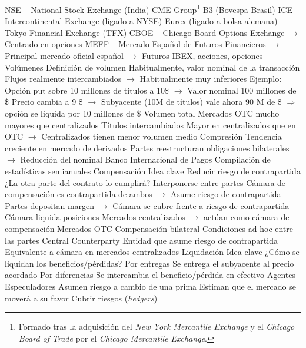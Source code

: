 \documentclass{nuevotema}
\begin{document}
\begin{esquemal}
				\4[] NSE -- National Stock Exchange (India)
				\4[] CME Group\footnote{Formado tras la adquisición del \textit{New York Mercantile Exchange} y el \textit{Chicago Board of Trade} por el \textit{Chicago Mercantile Exchange}.}
				\4[] B3 (Bovespa Brasil)
				\4[] ICE - Intercontinental Exchange (ligado a NYSE)
				\4[] Eurex (ligado a bolsa alemana)
				\4[] Tokyo Financial Exchange (TFX)
				\4[] CBOE -- Chicago Board Options Exchange
				\4[] $\to$ Centrado en opciones
				\4[] MEFF -- Mercado Español de Futuros Financieros
				\4[] $\to$ Principal mercado oficial español
				\4[] $\to$ Futuros IBEX, acciones, opciones
		\2 Volúmenes
			\3 Definición de volumen
				\4 Habitualmente, valor nominal de la transacción
				\4[] Flujos realmente intercambiados
				\4[] $\to$ Habitualmente muy inferiores
				\4 Ejemplo:
				\4[] Opción put sobre 10 millones de títulos a 10\$
				\4[] $\to$ Valor nominal 100 millones de \$
				\4[] Precio cambia a 9 \$
				\4[] $\to$ Subyacente (10M de títulos) vale ahora 90 M de \$
				\4[] $\Rightarrow$ opción se liquida por 10 millones de \$
			\3 Volumen total
				\4 Mercados OTC mucho mayores que centralizados
			\3 Títulos intercambiados
				\4 Mayor en centralizados que en OTC
				\4[] $\to$ Centralizados tienen menor volumen medio
			\3 Compresión
				\4 Tendencia creciente en mercado de derivados
				\4 Partes reestructuran obligaciones bilaterales
				\4[] $\to$ Reducción del nominal
			\3 Banco Internacional de Pagos
				\4 Compilación de estadísticas semianuales
		\2 Compensación
			\3 Idea clave
				\4 Reducir riesgo de contrapartida
				\4[] ¿La otra parte del contrato lo cumplirá?
				\4 Interponerse entre partes
				\4[] Cámara de compensación es contrapartida de ambos
				\4[] $\to$ Asume riesgo de contrapartida
				\4[] Partes depositan margen
				\4[] $\to$ Cámara se cubre frente a riesgo de contrapartida
				\4[] Cámara liquida posiciones
			\3 Mercados centralizados
				\4[] $\to$ actúan como cámara de compensación
			\3 Mercados OTC
				\4 Compensación bilateral
				\4[] Condiciones ad-hoc entre las partes
				\4 Central Counterparty
				\4[] Entidad que asume riesgo de contrapartida
				\4[] Equivalente a cámara en mercados centralizados
		\2 Liquidación
			\3 Idea clave
				\4 ¿Cómo se liquidan los beneficios/pérdidas?
			\3 Por entregas
				\4 Se entrega el subyacente al precio acordado
			\3 Por diferencias
				\4 Se intercambia el beneficio/pérdida en efectivo
		\2 Agentes
			\3 Especuladores
				\4 Asumen riesgo a cambio de una prima
				\4 Estiman que el mercado se moverá a su favor
			\3 Cubrir riesgos (\textit{hedgers})

\end{esquemal}
\end{document}
